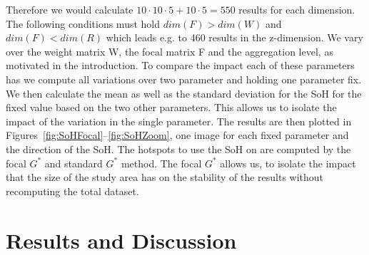 \documentclass{itatnew}
\begin{document}
Therefore we would calculate $10 \cdot 10 \cdot 5 + 10 \cdot 5=550$ results for each dimension.
The following conditions must hold $dim(F) > dim(W)$ and $dim(F) < dim(R)$ 
which leads e.g. to 460 results in the z-dimension.
We vary over the weight matrix W, the focal matrix F and the aggregation level, as motivated in the introduction.
To compare the impact each of these parameters has we compute all variations 
over two parameter and holding one parameter fix. We then calculate the mean as 
well as the standard deviation for the SoH for the fixed value based on the two 
other parameters. This allows us to isolate the impact of the variation in the 
single parameter. The results are then plotted in 
Figures~\ref{fig:SoHFocal}--\ref{fig:SoHZoom}, one image for each fixed 
parameter and the direction of the SoH.
The hotspots to use the SoH on are computed by the focal $G^*$ and standard $G^*$ method. The focal $G^*$ allows us, to isolate the impact that the size of the study area has on the stability of the results without recomputing the total dataset. 





\section{Results and Discussion}

%
\end{document}
